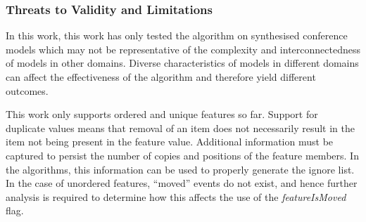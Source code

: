 \documentclass[12pt, a4paper]{report} \usepackage[titletoc]{appendix}
\begin{document}
\subsubsection{Threats to Validity and Limitations}
\label{sec:limitations_and_future_work}
In this work, this work has only tested the algorithm on synthesised conference models which may not be representative of the complexity and interconnectedness of models in other domains. Diverse characteristics of models in different domains can affect the effectiveness of the algorithm and therefore yield different outcomes. 

This work only supports ordered and unique features so far. Support for duplicate values means that removal of an item does not necessarily result in the item not being present in the feature value. Additional information must be captured to persist the number of copies and positions of the feature members. In the algorithms, this information can be used to properly generate the ignore list. In the case of unordered features, ``moved'' events do not exist, and hence further analysis is required to determine how this affects the use of the \emph{featureIsMoved} flag. 







\end{document}
